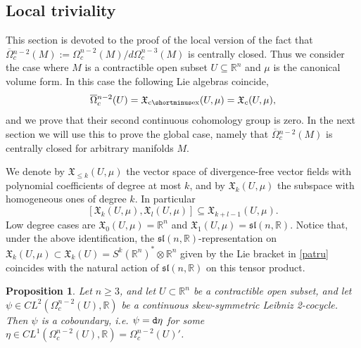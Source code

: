 \documentclass{article}
\newcommand{\fX}{\mathfrak{X}}
\newcommand{\R}{\mathbb{R}}
\newcommand{\oline}{\overline}
\newcommand{\dd}{{\tt d}}
\newcommand{\ceX}{\fX_{\mathrm{c}\shortminus\mathrm{ex}}}
\newtheorem{Proposition}[Theorem]{Proposition}
\theoremstyle{definition}
\begin{document}
\subsection{Local triviality}

This section is devoted to the proof of the local version of the fact that 
$\oline{\Omega}{}_c^{n-2}(M):={\Omega_c^{n-2}(M)}/{d\Omega_{c}^{n-3}(M)}$ is centrally closed.
Thus we consider  the case where $M$ is a contractible open subset $U\subseteq \R^n$ and 
$\mu$ is the canonical volume form. In this case the following Lie algebras coincide,
\begin{equation}\label{three}
\oline{\Omega}{}_c^{n-2}(U)=\ceX(U,\mu)=\fX_c(U,\mu),
\end{equation}
and we prove that their second continuous cohomology group is zero.
In the next section we will use this to prove the global case, namely that $\oline{\Omega}{}^{n-2}_{c}(M)$ is centrally closed for arbitrary manifolds $M$.

We denote by $\fX_{\leq k}(U, \mu)$ the vector space of divergence-free vector fields with polynomial coefficients of degree at most $k$, 
and by $\fX_{ k}(U, \mu)$ the subspace with homogeneous ones of degree $k$. 
In particular 
\begin{equation}\label{patru}
[\fX_{ k}(U, \mu),\fX_{ l}(U, \mu)]\subseteq \fX_{ k+l-1}(U, \mu).
\end{equation}
Low degree cases are $\fX_{ 0}(U, \mu)=\R^n$ and $\fX_{ 1}(U, \mu)=\mathfrak{sl}(n,\R)$.
Notice that, under the above identification, the  $\mathfrak{sl}(n,\R)$-representation on $\fX_{k}(U, \mu) \subset \fX_{k}(U)=S^{k}(\R^{n})^*\otimes \R^n$ 
given by the Lie bracket in \eqref{patru} coincides with the natural action of $\mathfrak{sl}(n,\R)$ on this tensor product.


\begin{Proposition}\label{prop:workhorse}
    Let $n\geq 3$, and let $U\subset \mathbb R^n$ be a contractible open subset, and let $\psi\in CL^{2}(\Omega^{n-2}_c(U),\R)$ be a continuous skew-symmetric 
    Leibniz 2-cocycle. Then $\psi$ is a coboundary, i.e. $\psi=\dd\eta$ for some $\eta\in CL^{1}(\Omega^{n-2}_c(U),\R)=\Omega^{n-2}_c(U)'$.
\end{Proposition}
\end{document}
